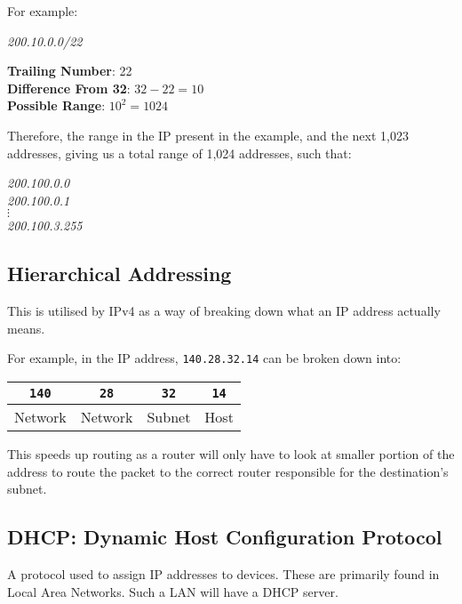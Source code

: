 \documentclass{article}
\begin{document}
For example:

\begin{center}
  \textit{200.10.0.0/22}
\end{center}

\textbf{Trailing Number}: 22\\
\textbf{Difference From 32}: $32 - 22 = 10$\\
\textbf{Possible Range}: $10^2 = 1024$

Therefore, the range in the IP present in the example, and the next 1,023 addresses, giving us a total range of 1,024 addresses, such that:

\begin{center}
  \textit{
    200.100.0.0\\
    200.100.0.1\\
    $\vdots$\\
    200.100.3.255
  }
\end{center}

\subsection{Hierarchical Addressing}

This is utilised by IPv4 as a way of breaking down what an IP address actually means.

For example, in the IP address, \texttt{140.28.32.14} can be broken down into:

\begin{center}
  \begin{tabular}{|c|c|c|c|}
    \hline
    \texttt{140} & \texttt{28} & \texttt{32} & \texttt{14}\\
    \hline
    Network & Network & Subnet & Host\\
    \hline
  \end{tabular}
\end{center}

This speeds up routing as a router will only have to look at smaller portion of the address to route the packet to the correct router responsible for the destination's subnet.

\subsection{DHCP: Dynamic Host Configuration Protocol}

A protocol used to assign IP addresses to devices. These are primarily found in Local Area Networks. Such a LAN will have a DHCP server.
\end{document}

